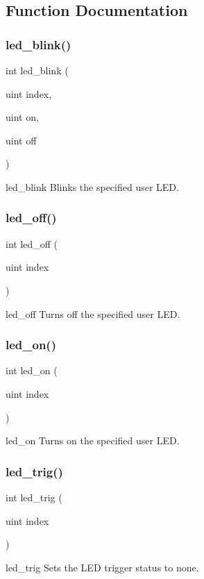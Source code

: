 \subsection{Function Documentation}
\mbox{\label{led_8h_af94e27b5792d301ea095431a43c22078}} 
\subsubsection{led\+\_\+blink()}
{\footnotesize\ttfamily int led\+\_\+blink (\begin{DoxyParamCaption}\item[{uint}]{index,  }\item[{uint}]{on,  }\item[{uint}]{off }\end{DoxyParamCaption})}

led\+\_\+blink Blinks the specified user L\+ED. \mbox{\label{led_8h_a1519411ed65d1afbe5a20774b47b5b50}} 
\subsubsection{led\+\_\+off()}
{\footnotesize\ttfamily int led\+\_\+off (\begin{DoxyParamCaption}\item[{uint}]{index }\end{DoxyParamCaption})}

led\+\_\+off Turns off the specified user L\+ED. \mbox{\label{led_8h_a2d9d74d6de63682761865ba90761e340}} 
\subsubsection{led\+\_\+on()}
{\footnotesize\ttfamily int led\+\_\+on (\begin{DoxyParamCaption}\item[{uint}]{index }\end{DoxyParamCaption})}

led\+\_\+on Turns on the specified user L\+ED. \mbox{\label{led_8h_afae7e33a2ee9474e528d86a2a88a1242}} 
\subsubsection{led\+\_\+trig()}
{\footnotesize\ttfamily int led\+\_\+trig (\begin{DoxyParamCaption}\item[{uint}]{index }\end{DoxyParamCaption})}

led\+\_\+trig Sets the L\+ED trigger status to \textquotesingle{}none\textquotesingle{}. 